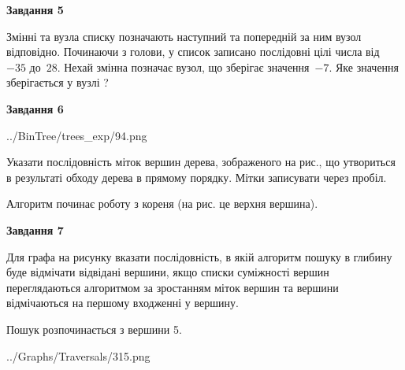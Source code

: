 \documentclass[12pt, ukrainian]{article}
\begin{document}
{\begin {large}
{\begin {center}\textbf{Завдання 5}\end {center}}\par
Змінні  та  вузла списку позначають наступний та попередній за ним вузол відповідно. Починаючи з голови, у список записано послідовні цілі числа від~$-35$ до~$28$. Нехай змінна  позначає вузол, що зберігає значення~$-7$.
Яке значення зберігається у вузлі  ?\par
\newpage

{\begin {center}\textbf{Завдання 6}\end {center}}\par

\begin{center}
	{../BinTree/trees_exp/94.png}
\end{center}
Указати послідовність міток вершин дерева, зображеного на рис., що утвориться в результаті обходу дерева в прямому порядку. Мітки записувати через пробіл.\par Алгоритм починає роботу з кореня (на рис. це верхня вершина).\par
\newpage

{\begin {center}\textbf{Завдання 7}\end {center}}\par
Для графа на рисунку вказати послідовність, в якій алгоритм пошуку в глибину буде відмічати відвідані вершини, якщо списки суміжності вершин переглядаються алгоритмом за зростанням міток вершин та вершини відмічаються на першому вход\-женні у вершину.\par
Пошук розпочинається з вершини 5.\par

\begin{center}
	{../Graphs/Traversals/315.png}
\end{center}\par
\newpage


\end{large}}
\end{document}
